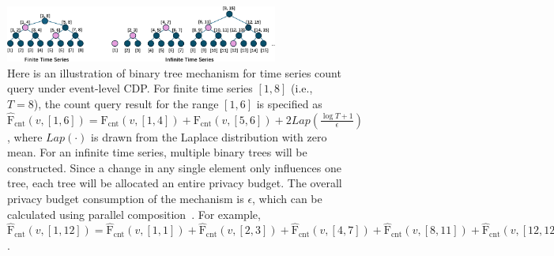 \begin{figure}[h]
	\centering
	\includegraphics[width=0.8\textwidth]{submissions/submission4/figs/03-count/tree_mechanism-crop.pdf}
 	\caption{Here is an illustration of binary tree mechanism for time series count query under event-level CDP. For finite time series $[1, 8]$ (i.e., $T=8$), the count query result for the range $[1, 6]$ is specified as $\mathrm{\hat{F}}_{\mathrm{cnt}}(v, [1, 6])=\mathrm{F}_{\mathrm{cnt}}(v, [1, 4])+\mathrm{F}_{\mathrm{cnt}}(v, [5, 6])+2Lap(\frac{\log T+1}{\epsilon})$, where $Lap(\cdot)$ is drawn from the Laplace distribution with zero mean. For an infinite time series, multiple binary trees will be constructed. Since a change in any single element only influences one tree, each tree will be allocated an entire privacy budget. The overall privacy budget consumption of the mechanism is $\epsilon$, which can be calculated using parallel composition~\cite{li2017differential}. For example, $\mathrm{\hat{F}}_{\mathrm{cnt}}(v, [1, 12])=\mathrm{\hat{F}}_{\mathrm{cnt}}(v, [1, 1])+\mathrm{\hat{F}}_{\mathrm{cnt}}(v, [2, 3])+\mathrm{\hat{F}}_{\mathrm{cnt}}(v, [4, 7])+\mathrm{\hat{F}}_{\mathrm{cnt}}(v, [8, 11])+\mathrm{\hat{F}}_{\mathrm{cnt}}(v, [12, 12])$.}
	\label{tree_mechanism}
\end{figure}


